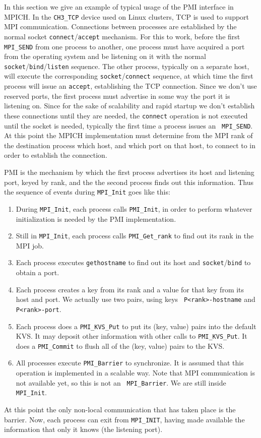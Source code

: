 \documentclass[11pt]{article}
\begin{document}
In this section we give an example of typical usage of the PMI interface
in MPICH.  In the {\tt CH3\_TCP} device used on Linux clusters, TCP is
used to support MPI communication.  Connections between processes are
established by the normal socket {\tt connect}/{\tt accept} mechanism.
For this to work, before the first {\tt MPI\_SEND} from one process to
another, one process must have acquired a port from the operating system
and be listening on it with the normal {\tt socket}/{\tt bind}/{\tt listen}
sequence.  The other process, typically on a separate host, will execute
the corresponding {\tt socket}/{\tt connect} sequence, at which time the
first process will issue an {\tt accept}, establishing the TCP
connection.  Since we don't use reserved ports, the first process must
advertise in some way the port it is listening on.  Since for the sake
of scalability and rapid startup we don't establish these connections
until they are needed, the {\tt connect} operation is not executed until
the socket is needed, typically the first time a process issues an {\tt
  MPI\_SEND}.  At this point the MPICH implementation must determine from the
MPI rank of the destination process which host, and which port on that
host, to connect to in order to establish the connection.

PMI is the mechanism by which the first process advertises its host and
listening port, keyed by rank, and the the second process finds out this
information.  Thus the sequence of events during {\tt MPI\_Init} goes
like this:
\begin{enumerate}
\item During {\tt MPI\_Init}, each process calls {\tt PMI\_Init}, in
  order to perform whatever initialization is needed by the PMI
  implementation.
\item Still in {\tt MPI\_Init}, each process calls {\tt PMI\_Get\_rank}
  to find out its rank in the MPI job.
\item Each process executes {\tt gethostname} to find out its host and
  {\tt socket}/{\tt bind} to obtain a port.
\item Each process creates a key from its rank and a value for that key
  from its host and port.  We actually use two pairs, using keys {\tt
    P<rank>-hostname} and {\tt P<rank>-port}.
\item Each process does a {\tt PMI\_KVS\_Put} to put its (key, value)
  pairs into the default KVS.  It may deposit other information with
  other calls to {\tt PMI\_KVS\_Put}.  It does a {\tt PMI\_Commit} to
  flush all of the (key, value) pairs to the KVS.
\item All processes execute {\tt PMI\_Barrier} to synchronize.  It is
  assumed that this operation is implemented in a scalable way.  Note
  that MPI communication is not available yet, so this is not an {\tt
    MPI\_Barrier}.  We are still inside {\tt MPI\_Init}.
\end{enumerate}
At this point the only non-local communication that has taken place is
the barrier.  Now, each process can exit from {\tt MPI\_INIT}, having
made available the information that only it knows (the listening port).
\end{document}
